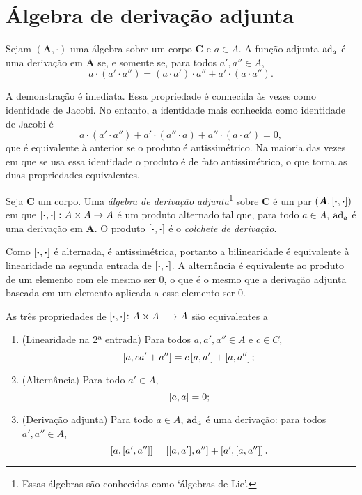 \section{Álgebra de derivação adjunta}

\begin{proposition}
Sejam $(\bm A,\cdot)$ uma álgebra sobre um corpo $\bm C$ e $a \in A$. A função adjunta $\operatorname{ad}_a$ é uma derivação em $\bm A$ se, e somente se, para todos $a',a'' \in A$,
	\begin{equation*}
	a \cdot (a' \cdot a'') = (a \cdot a') \cdot a'' + a' \cdot (a \cdot a'').
	\end{equation*}
\end{proposition}

A demonstração é imediata. Essa propriedade é conhecida às vezes como identidade de Jacobi. No entanto, a identidade mais conhecida como identidade de Jacobi é
	\begin{equation*}
	a \cdot (a' \cdot a'') + a' \cdot (a'' \cdot a) + a'' \cdot (a \cdot a') = 0,
	\end{equation*}
que é equivalente à anterior se o produto é antissimétrico. Na maioria das vezes em que se usa essa identidade o produto é de fato antissimétrico, o que torna as duas propriedades equivalentes.

\begin{definition}
Seja $\bm C$ um corpo. Uma \emph{álgebra de derivação adjunta}\footnote{Essas álgebras são conhecidas como `álgebras de Lie'.} sobre $\bm C$ é um par $(\bm A,\left[{\bm{\cdot}},{\bm{\cdot}}\right])$ em que $\left[{\bm{\cdot}},{\bm{\cdot}}\right]\colon A \times A \to A$ é um produto alternado tal que, para todo $a \in A$, $\operatorname{ad}_a$ é uma derivação em $\bm A$. O produto $\left[{\bm{\cdot}},{\bm{\cdot}}\right]$ é o \emph{colchete de derivação}.
\end{definition}

Como $\left[{\bm{\cdot}},{\bm{\cdot}}\right]$ é alternada, é antissimétrica, portanto a bilinearidade é equivalente à linearidade na segunda entrada de $\left[{\bm{\cdot}},{\bm{\cdot}}\right]$. A alternância é equivalente ao produto de um elemento com ele mesmo ser $0$, o que é o mesmo que a derivação adjunta baseada em um elemento aplicada a esse elemento ser $0$.

As três propriedades de ${\left[{\bm{\cdot}},{\bm{\cdot}}\right]}\colon {A \times A} \longrightarrow {A}$ são equivalentes a
	\begin{enumerate}
	\item (Linearidade na 2ª entrada) Para todos $a,a',a'' \in A$ e $c \in C$,
		\begin{equation*}
		\left[{a},{ca'+a''}\right] = c\left[{a},{a'}\right] + \left[{a},{a''}\right];
		\end{equation*}
	\item (Alternância) Para todo $a' \in A$,
		\begin{equation*}
		\left[{a},{a}\right] = 0;
		\end{equation*}
	\item (Derivação adjunta) Para todo $a \in A$, $\operatorname{ad}_a$ é uma derivação: para todos $a',a'' \in A$,
		\begin{equation*}
		\left[{a},{\left[{a'},{a''}\right]}\right] = \left[{\left[{a},{a'}\right]},{a''}\right] + \left[{a'},{\left[{a},{a''}\right]}\right].
		\end{equation*}
	\end{enumerate}

